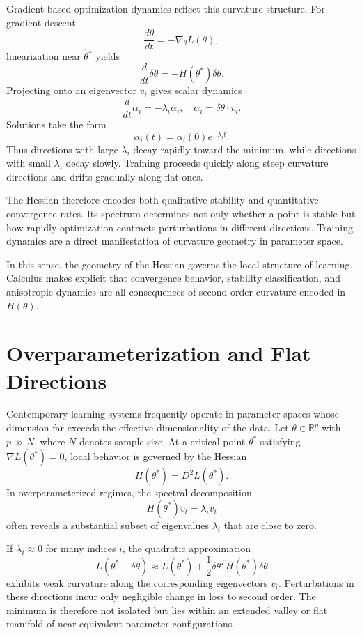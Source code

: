 \documentclass[12pt]{book}
\begin{document}
Gradient-based optimization dynamics reflect this curvature structure. For gradient descent
\[
\frac{d\theta}{dt} = - \nabla_\theta L(\theta),
\]
linearization near $\theta^\ast$ yields
\[
\frac{d}{dt} \delta \theta
=
-
H(\theta^\ast)
\delta \theta.
\]
Projecting onto an eigenvector $v_i$ gives scalar dynamics
\[
\frac{d}{dt} \alpha_i
=
-
\lambda_i \alpha_i,
\quad
\alpha_i = \delta \theta \cdot v_i.
\]
Solutions take the form
\[
\alpha_i(t)
=
\alpha_i(0)
e^{-\lambda_i t}.
\]
Thus directions with large $\lambda_i$ decay rapidly toward the minimum, while directions with small $\lambda_i$ decay slowly. Training proceeds quickly along steep curvature directions and drifts gradually along flat ones.

The Hessian therefore encodes both qualitative stability and quantitative convergence rates. Its spectrum determines not only whether a point is stable but how rapidly optimization contracts perturbations in different directions. Training dynamics are a direct manifestation of curvature geometry in parameter space.

In this sense, the geometry of the Hessian governs the local structure of learning. Calculus makes explicit that convergence behavior, stability classification, and anisotropic dynamics are all consequences of second-order curvature encoded in $H(\theta)$.

\section{Overparameterization and Flat Directions}

Contemporary learning systems frequently operate in parameter spaces whose dimension far exceeds the effective dimensionality of the data. Let $\theta \in \mathbb{R}^p$ with $p \gg N$, where $N$ denotes sample size. At a critical point $\theta^\ast$ satisfying $\nabla L(\theta^\ast)=0$, local behavior is governed by the Hessian
\[
H(\theta^\ast) = D^2 L(\theta^\ast).
\]
In overparameterized regimes, the spectral decomposition
\[
H(\theta^\ast) v_i = \lambda_i v_i
\]
often reveals a substantial subset of eigenvalues $\lambda_i$ that are close to zero.

If $\lambda_i \approx 0$ for many indices $i$, the quadratic approximation
\[
L(\theta^\ast + \delta \theta)
\approx
L(\theta^\ast)
+
\frac{1}{2}
\delta \theta^{T}
H(\theta^\ast)
\delta \theta
\]
exhibits weak curvature along the corresponding eigenvectors $v_i$. Perturbations in these directions incur only negligible change in loss to second order. The minimum is therefore not isolated but lies within an extended valley or flat manifold of near-equivalent parameter configurations.
\end{document}
